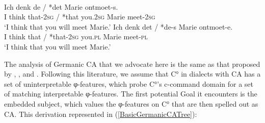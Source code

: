 \documentclass[output=paper
,modfonts
,nonflat
]{langsci/langscibook}
\begin{document}
\ea \label{TegelenDutch} \label{TegelenDutchBasic}
 \\
\begin{xlist}
\ex 
\gll Ich denk de / *det  Marie ontmoet-s.\\
I think that-2\textsc{sg} / *that you.2\textsc{sg} Marie meet-2\textsc{sg} \\
\glt `I think that you will meet Marie.'					
\ex 
\gll Ich denk det\circled{-\O} / *de-s  Marie ontmoet-e. \\
I think that / *that-2\textsc{sg} you.\textsc{pl} Marie meet-\textsc{pl} \\
\glt `I think that you will meet Marie.'	 
\end{xlist}
\z
\noindent The analysis of Germanic CA that we advocate here is the same as that proposed by \citet{Carstens:2003}, \citet{vanKoppen:2005}, and \citet{Haegeman:2012}. Following this literature, we assume that C° in dialects with CA has a set of uninterpretable φ-features, which probe C°’s c-command domain for a set of matching interpretable φ-features. The first potential Goal it encounters is the embedded subject, which values the φ-features on C° that are then spelled out as CA. This derivation represented in (\ref{BasicGermanicCATree}):
\end{document}
